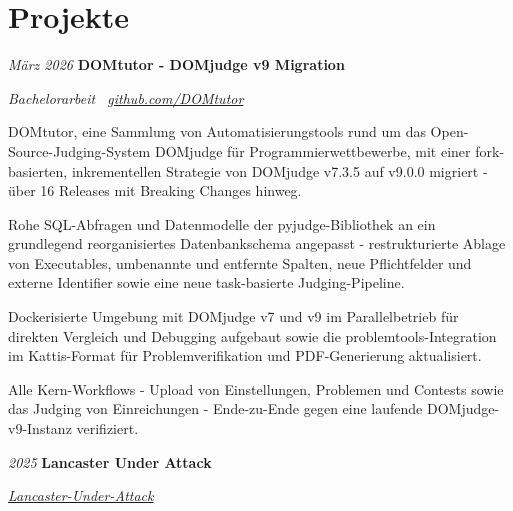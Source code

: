 \documentclass[german]{cv}
\begin{document}
    \section{Projekte}

        \begin{twocolentry}{
        \textit{März 2026}}
            \textbf{DOMtutor - DOMjudge v9 Migration}

            \textit{Bachelorarbeit \textperiodcentered\ \href{https://github.com/DOMtutor}{github.com/DOMtutor}}
        \end{twocolentry}

        \vspace{0.10 cm}
        \begin{onecolentry}
            \begin{highlights}
                \item DOMtutor, eine Sammlung von Automatisierungstools rund um das Open-Source-Judging-System DOMjudge für Programmierwettbewerbe, mit einer fork-basierten, inkrementellen Strategie von DOMjudge v7.3.5 auf v9.0.0 migriert - über 16 Releases mit Breaking Changes hinweg.
                \item Rohe SQL-Abfragen und Datenmodelle der pyjudge-Bibliothek an ein grundlegend reorganisiertes Datenbankschema angepasst - restrukturierte Ablage von Executables, umbenannte und entfernte Spalten, neue Pflichtfelder und externe Identifier sowie eine neue task-basierte Judging-Pipeline.
                \item Dockerisierte Umgebung mit DOMjudge v7 und v9 im Parallelbetrieb für direkten Vergleich und Debugging aufgebaut sowie die problemtools-Integration im Kattis-Format für Problemverifikation und PDF-Generierung aktualisiert.
                \item Alle Kern-Workflows - Upload von Einstellungen, Problemen und Contests sowie das Judging von Einreichungen - Ende-zu-Ende gegen eine laufende DOMjudge-v9-Instanz verifiziert.
            \end{highlights}
        \end{onecolentry}

        \vspace{0.13 cm}

        \begin{twocolentry}{
        \textit{2025}}
            \textbf{Lancaster Under Attack}

            \textit{\href{https://github.com/prosk-sudo/Lancaster-Under-Attack}{Lancaster-Under-Attack}}
        \end{twocolentry}
\end{document}
